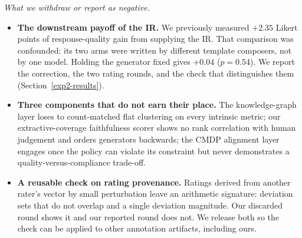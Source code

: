 \documentclass[preprint,12pt]{elsarticle}
\begin{document}
\emph{What we withdraw or report as negative.}
\begin{itemize}\setlength{\itemsep}{2pt}
  \item \textbf{The downstream payoff of the IR.} We previously measured $+2.35$ Likert points of
  response-quality gain from supplying the IR. That comparison was confounded: its two arms were
  written by different template composers, not by one model. Holding the generator fixed gives
  $+0.04$ ($p = 0.54$). We report the correction, the two rating rounds, and the check that
  distinguishes them (Section~\ref{exp2-results}).
  \item \textbf{Three components that do not earn their place.} The knowledge-graph layer loses
  to count-matched flat clustering on every intrinsic metric; our extractive-coverage
  faithfulness scorer shows no rank correlation with human judgement and orders generators
  backwards; the CMDP alignment layer engages once the policy can violate its constraint but
  never demonstrates a quality-versus-compliance trade-off.
  \item \textbf{A reusable check on rating provenance.} Ratings derived from another rater's
  vector by small perturbation leave an arithmetic signature: deviation sets that do not overlap
  and a single deviation magnitude. Our discarded round shows it and our reported round does not.
  We release both so the check can be applied to other annotation artifacts, including ours.
\end{itemize}
\end{document}
